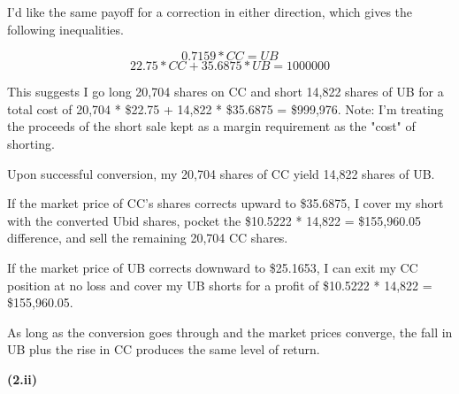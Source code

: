 \documentclass[11pt]{article}
\begin{document}
I'd like the same payoff for a correction in either direction, which gives the following inequalities.

$$ 0.7159 * CC = UB $$
$$ 22.75 * CC + 35.6875 * UB = 1000000 $$

This suggests I go long 20,704 shares on CC and short 14,822 shares of UB for a total cost of 20,704 * \$22.75 + 14,822 * \$35.6875 = \$999,976. Note: I'm treating the proceeds of the short sale kept as a margin requirement as the "cost" of shorting. 

Upon successful conversion, my 20,704 shares of CC yield 14,822 shares of UB. 

If the market price of CC's shares corrects upward to \$35.6875, I cover my short with the converted Ubid shares, pocket the \$10.5222 * 14,822 = \$155,960.05 difference, and sell the remaining 20,704 CC shares. 

If the market price of UB corrects downward to \$25.1653, I can exit my CC position at no loss and cover my UB shorts for a profit of \$10.5222 * 14,822 = \$155,960.05.

As long as the conversion goes through and the market prices converge, the fall in UB plus the rise in CC produces the same level of return.

\textbf{(2.ii)}
\end{document}
